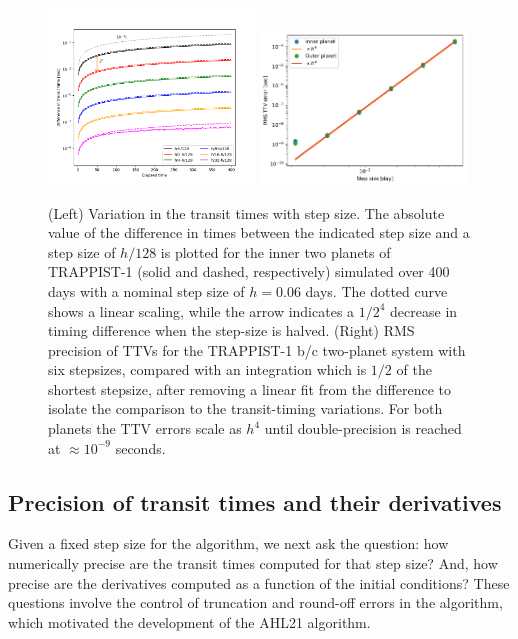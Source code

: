 \documentclass[fleqn,usenatbib,twocolumn]{mnras}
\begin{document}
\begin{figure}
    \centering
    \includegraphics[width=0.49\textwidth]{Transit_time_diff_vs_stepsize.png}
    \includegraphics[width=0.49\textwidth]{timing_error_vs_h.pdf}
    \caption{(Left) Variation in the transit times with step size.  The absolute value of the difference in times between the indicated step size and a step size of $h/128$ is plotted for the inner two planets of TRAPPIST-1 (solid and dashed, respectively) simulated over 400 days with a nominal step size of $h=0.06$ days.  The dotted curve shows a linear scaling, while the arrow indicates a $1/2^4$ decrease in timing difference when the step-size is halved. (Right) RMS precision of TTVs for the TRAPPIST-1 b/c two-planet system with six stepsizes,
    compared with an integration which is $1/2$ of the shortest stepsize, after
    removing a linear fit from the difference to isolate the comparison to the transit-timing variations.  For both planets the TTV errors scale as $h^4$ until double-precision is reached at $\approx 10^{-9}$ seconds.}
    \label{fig:timing_accuracy}
\end{figure}

\subsection{Precision of transit times and their derivatives} \label{sec:transit_precision}

Given a fixed step size for the algorithm, we next ask the question:  how numerically precise are the transit times computed for that step size?   And, how precise are the derivatives computed as a function of the initial conditions?  These questions involve the control of truncation and round-off errors in the algorithm, which motivated the development of the {\sc AHL21} algorithm.
\end{document}
